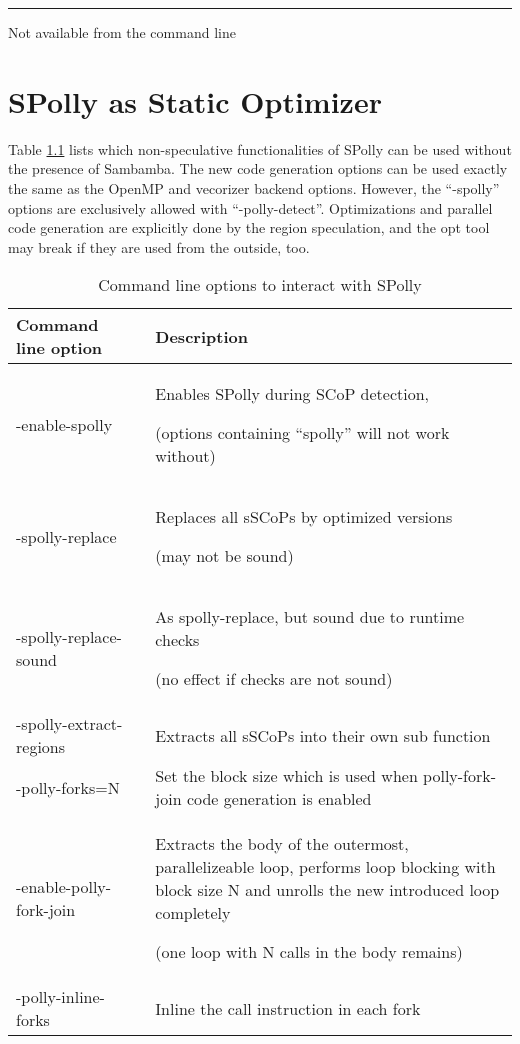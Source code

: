 \vfill
\vfill
\vfill
\rule{\textwidth}{0.1mm}
  \footnotemark[1] Not available from the command line \\

\clearpage

\chapter{SPolly as Static Optimizer}
\label{AppendixC}
Table \ref{tab:CommandLineOptions} lists which non-speculative functionalities of
SPolly can be used without the presence of Sambamba. 
The new code generation options can be used exactly the same as the OpenMP and vecorizer backend options.
However, the ``-spolly'' options are exclusively allowed with ``-polly-detect''.
Optimizations and parallel code 
generation are explicitly done by the region speculation, and the opt tool may
break if they are used from the outside, too.
\\

\begin{table}[htbp]
  \begin{framed}
  \caption{Command line options to interact with SPolly}
  \begin{tabularx}{\textwidth}{ l p{1mm} X  }
    Command line option     && Description  \\
    \hline
    -enable-spolly          && Enables SPolly during SCoP detection,\par
                                (options containing ``spolly'' will not work without) \\ 
    -spolly-replace         && Replaces all sSCoPs by optimized versions \par 
                                (may not be sound)  \\
    -spolly-replace-sound   && As spolly-replace, but sound due to runtime checks \par
                                (no effect if checks are not sound)\\
    -spolly-extract-regions && Extracts all sSCoPs into their own sub function \\
    -polly-forks=N          && Set the block size which is used when 
                             polly-fork-join code generation is enabled\\
    -enable-polly-fork-join && Extracts the body of the outermost,
                             parallelizeable loop, performs loop blocking with
                             block size N and unrolls the new introduced loop 
                             completely \par
                             (one loop with N calls in the body remains)\\
    -polly-inline-forks     && Inline the call instruction in each fork \\
  \end{tabularx}
  \label{tab:CommandLineOptions}
  \end{framed}
\end{table}


